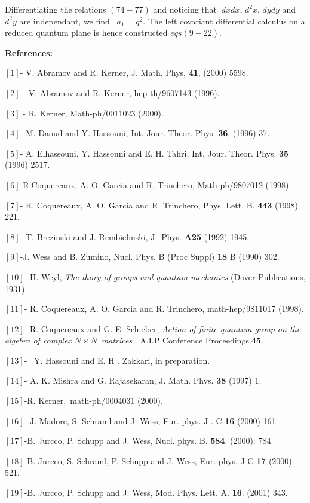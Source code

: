 \documentclass[a4paper,12pt,thmsa]{article}
\begin{document}
Differentiating the relations $(74-77)$ and noticing that $\ dxdx$, $d^2x$, $%
dydy$ and $d^2y$ are independant, we find \ $a_1=q^2$. The left covariant
differential calculus on a reduced quantum plane is hence constructed $%
eqs(9-22).$

\newpage

\textbf{References:}

$\left[ 1\right] $- V. Abramov and R. Kerner, J. Math. Phys, \textbf{41},
(2000) 5598.

$\left[ 2\right] $ - V. Abramov and R. Kerner, hep-th/9607143 (1996).

$\left[ 3\right] $ - R. Kerner, Math-ph/0011023 (2000).

$\left[ 4\right] $- M. Daoud and Y. Hassouni, Int. Jour. Theor. Phys.
\textbf{36}, (1996) 37.

$\left[ 5\right] $- A. Elhassouni, Y. Hassouni and E. H. Tahri, Int. Jour.
Theor. Phys. \textbf{35 } (1996) 2517.

$\left[ 6\right] $-R.Coquereaux, A. O. Garcia and R. Trinchero,
Math-ph/9807012 (1998).

$\left[ 7\right] $- R. Coquereaux, A. O. Garcia and R. Trinchero, Phys.
Lett. B. \textbf{443} (1998) 221.

$\left[ 8\right] $- T. Brezinski and J. Rembielinski, J.\ Phys. \textbf{A25}
(1992) 1945.

$\left[ 9\right] $-J. Wess and B. Zumino, Nucl. Phys. B (Proc Suppl) \textbf{%
18} B (1990) 302.

$[10]$- H. Weyl, \textit{The thory of groups and quantum mechanics} (Dover
Publications, 1931).

$\left[ 11\right] $- R. Coquereaux, A. O. Garcia and R. Trinchero,
math-hep/9811017 (1998).

$\left[ 12\right] $- R. Coquereaux and G. E. Schieber, \textit{Action of
finite quantum group on the algebra of complex }$N\times N$\textit{\ matrices%
}. A.I.P Conference Proceedings.\textbf{45}.

$\left[ 13\right] $- \ Y. Hassouni and E. H . Zakkari, in preparation.

$\left[ 14\right] $- A. K. Mishra and G. Rajasekaran, J. Math. Phys. \textbf{%
38} (1997) 1.

$[15]$-R. Kerner,\textit{\ }math-ph/0004031 (2000).

$\left[ 16\right] $- J. Madore, S. Schraml and J. Wess, Eur. phys. J . C
\textbf{16} (2000) 161.

$\left[ 17\right] $-B. Jurcco, P. Schupp and J. Wess, Nucl. phys. B. \textbf{%
584}. (2000). 784.

$\left[ 18\right] $-B. Jurcco, S. Schraml, P. Schupp and J. Wess, Eur. phys.
J C \textbf{17} (2000) 521.

$\left[ 19\right] $-B. Jurcco, P. Schupp and J. Wess, Mod. Phys. Lett. A.
\textbf{16}. (2001) 343.$\ $
\end{document}
